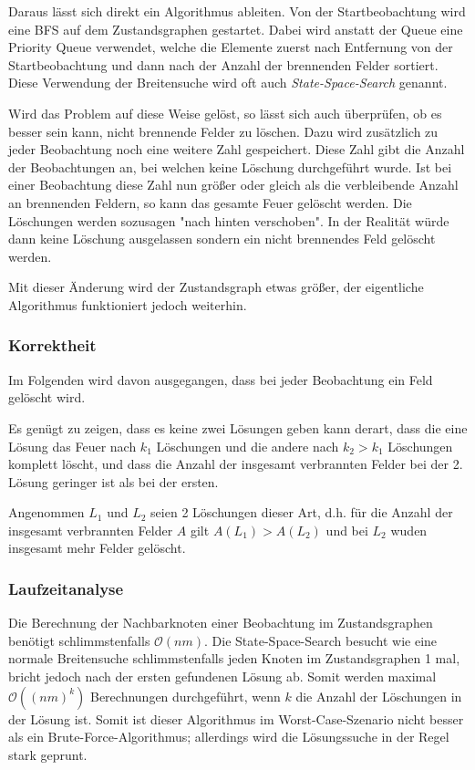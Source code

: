Daraus lässt sich direkt ein Algorithmus ableiten. Von der Startbeobachtung wird eine BFS auf dem Zustandsgraphen gestartet. Dabei wird anstatt der Queue eine Priority Queue verwendet, welche die Elemente zuerst nach Entfernung von der Startbeobachtung und dann nach der Anzahl der brennenden Felder sortiert. Diese Verwendung der Breitensuche wird oft auch \emph{State-Space-Search} genannt.

Wird das Problem auf diese Weise gelöst, so lässt sich auch überprüfen, ob es besser sein kann, nicht brennende Felder zu löschen. Dazu wird zusätzlich zu jeder Beobachtung noch eine weitere Zahl gespeichert. Diese Zahl gibt die Anzahl der Beobachtungen an, bei welchen keine Löschung durchgeführt wurde. Ist bei einer Beobachtung diese Zahl nun größer oder gleich als die verbleibende Anzahl an brennenden Feldern, so kann das gesamte Feuer gelöscht werden. Die Löschungen werden sozusagen "nach hinten verschoben". In der Realität würde dann keine Löschung ausgelassen sondern ein nicht brennendes Feld gelöscht werden.

Mit dieser Änderung wird der Zustandsgraph etwas größer, der eigentliche Algorithmus funktioniert jedoch weiterhin.

\subsubsection{Korrektheit}

Im Folgenden wird davon ausgegangen, dass bei jeder Beobachtung ein Feld gelöscht wird.

Es genügt zu zeigen, dass es keine zwei Lösungen geben kann derart, dass die eine Lösung das Feuer nach $k_1$ Löschungen und die andere nach $k_2 > k_1$ Löschungen komplett löscht, und dass die Anzahl der insgesamt verbrannten Felder bei der 2. Lösung geringer ist als bei der ersten. 

Angenommen $L_1$ und $L_2$ seien 2 Löschungen dieser Art, d.h. für die Anzahl der insgesamt verbrannten Felder $A$ gilt $A(L_1) > A(L_2)$ und bei $L_2$ wuden insgesamt mehr Felder gelöscht.

\subsubsection{Laufzeitanalyse}

Die Berechnung der Nachbarknoten einer Beobachtung im Zustandsgraphen benötigt schlimmstenfalls $\mathcal{O}(nm)$. Die State-Space-Search besucht wie eine normale Breitensuche schlimmstenfalls jeden Knoten im Zustandsgraphen 1 mal, bricht jedoch nach der ersten gefundenen Lösung ab. Somit werden maximal $\mathcal{O}((nm)^k)$ Berechnungen durchgeführt, wenn $k$ die  Anzahl der Löschungen in der Lösung ist.
Somit ist dieser Algorithmus im Worst-Case-Szenario nicht besser als ein Brute-Force-Algorithmus; allerdings wird die Lösungssuche in der Regel stark geprunt.

